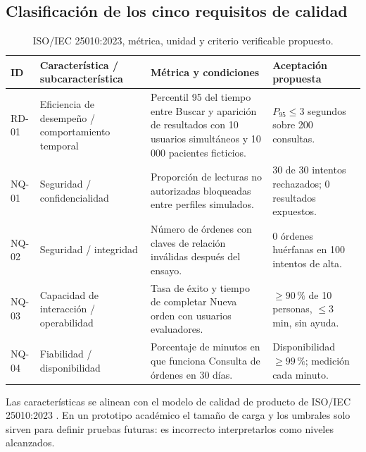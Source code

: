 \subsection{Clasificación de los cinco requisitos de calidad}
\begin{table}[H]\centering\small
\caption{ISO/IEC 25010:2023, métrica, unidad y criterio verificable propuesto.}\label{tab:calidad}
\begin{tabularx}{\linewidth}{@{}p{1.2cm}p{3.1cm}Xp{3.5cm}@{}}\toprule
\textbf{ID} & \textbf{Característica / subcaracterística} & \textbf{Métrica y condiciones} & \textbf{Aceptación propuesta}\\\midrule
RD-01 & Eficiencia de desempeño / comportamiento temporal & Percentil 95 del tiempo entre Buscar y aparición de resultados con 10 usuarios simultáneos y 10\,000 pacientes ficticios. & $P_{95}\leq3$ segundos sobre 200 consultas.\\
NQ-01 & Seguridad / confidencialidad & Proporción de lecturas no autorizadas bloqueadas entre perfiles simulados. & 30 de 30 intentos rechazados; 0 resultados expuestos.\\
NQ-02 & Seguridad / integridad & Número de órdenes con claves de relación inválidas después del ensayo. & 0 órdenes huérfanas en 100 intentos de alta.\\
NQ-03 & Capacidad de interacción / operabilidad & Tasa de éxito y tiempo de completar Nueva orden con usuarios evaluadores. & $\geq90\,\%$ de 10 personas, $\leq3$ min, sin ayuda.\\
NQ-04 & Fiabilidad / disponibilidad & Porcentaje de minutos en que funciona Consulta de órdenes en 30 días. & Disponibilidad $\geq99\,\%$; medición cada minuto.\\\bottomrule
\end{tabularx}
\end{table}
Las características se alinean con el modelo de calidad de producto de ISO/IEC 25010:2023 \cite{iso25010}. En un prototipo académico el tamaño de carga y los umbrales solo sirven para definir pruebas futuras: es incorrecto interpretarlos como niveles alcanzados.


